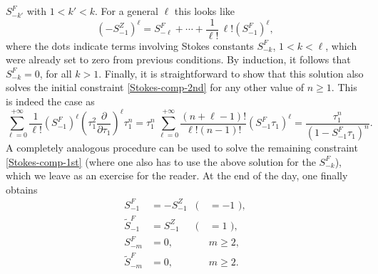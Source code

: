 \documentclass[11pt,a4paper]{article}
\begin{document}
$S_{-k'}^F$ with $1<k'<k$. For a general $\ell$ this looks like
%
\begin{equation}
\left( -S_{-1}^{Z} \right)^{\ell} = S_{-\ell}^{F} + \cdots + \frac{1}{\ell!}\, \ell!\left( S_{-1}^{F} \right)^{\ell},
\end{equation}
%
\noindent
where the dots indicate terms involving Stokes constants $S_{-k}^F$, $1<k<\ell$, which were already set to zero from previous conditions. By induction, it follows that $S_{-k}^F=0$, for all $k>1$. Finally, it is straightforward to show that this solution also solves the initial constraint \eqref{Stokes-comp-2nd} for any other value of $n\ge1$. This is indeed the case as
%
\begin{equation}
\sum_{\ell=0}^{+\infty} \frac{1}{\ell!} \left( S_{-1}^{F} \right)^{\ell} \left( \tau_{1}^{2} \frac{\partial}{\partial\tau_{1}} \right)^{\ell} \tau_{1}^{n} = \tau_{1}^{n}\, \sum_{\ell=0}^{+\infty} \frac{\left( n + \ell - 1 \right)!}{\ell! \left( n - 1 \right)!} \left( S_{-1}^{F} \tau_{1} \right)^{\ell} = \frac{\tau_{1}^{n}}{\left( 1 - S_{-1}^{F} \tau_{1} \right)^{n}}.
\end{equation}
%
\noindent
A completely analogous procedure can be used to solve the remaining constraint \eqref{Stokes-comp-1st} (where one also has to use the above solution for the $S_{-k}^F$), which we leave as an exercise for the reader. At the end of the day, one finally obtains
%
\begin{align}
\label{eq:Stokes-consts-relation-3}
S_{-1}^{F} &= - S_{-1}^{Z} &(\, &= - 1\,\, ), \\
\label{eq:Stokes-consts-relation-2}
\widetilde{S}_{-1}^{F} &= S_{-1}^{Z} &(\, &= 1\,\, ), \\
\label{eq:Stokes-consts-relation-4}
S_{-m}^{F} &= 0, &&m\ge2, \\
\label{eq:Stokes-consts-relation-5}
\widetilde{S}_{-m}^{F} &= 0, &&m\ge2.
\end{align}
\end{document}
